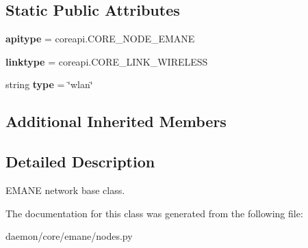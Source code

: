 \subsection*{Static Public Attributes}
\begin{DoxyCompactItemize}
\item 
\hypertarget{classcore_1_1emane_1_1nodes_1_1_emane_net_adbc1deacd2369b68e449874dd2a4cf2d}{{\bfseries apitype} = coreapi.\+C\+O\+R\+E\+\_\+\+N\+O\+D\+E\+\_\+\+E\+M\+A\+N\+E}\label{classcore_1_1emane_1_1nodes_1_1_emane_net_adbc1deacd2369b68e449874dd2a4cf2d}

\item 
\hypertarget{classcore_1_1emane_1_1nodes_1_1_emane_net_aacb214f07137072cbd06efab18aed1d7}{{\bfseries linktype} = coreapi.\+C\+O\+R\+E\+\_\+\+L\+I\+N\+K\+\_\+\+W\+I\+R\+E\+L\+E\+S\+S}\label{classcore_1_1emane_1_1nodes_1_1_emane_net_aacb214f07137072cbd06efab18aed1d7}

\item 
\hypertarget{classcore_1_1emane_1_1nodes_1_1_emane_net_a697b09c6e37f762d395eff9a9edd5613}{string {\bfseries type} = \char`\"{}wlan\char`\"{}}\label{classcore_1_1emane_1_1nodes_1_1_emane_net_a697b09c6e37f762d395eff9a9edd5613}

\end{DoxyCompactItemize}
\subsection*{Additional Inherited Members}


\subsection{Detailed Description}
\begin{DoxyVerb}EMANE network base class.
\end{DoxyVerb}
 

The documentation for this class was generated from the following file\+:\begin{DoxyCompactItemize}
\item 
daemon/core/emane/nodes.\+py\end{DoxyCompactItemize}
